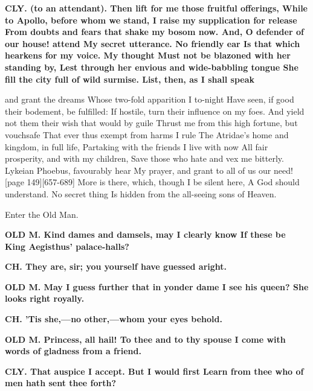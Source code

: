 \documentclass[11pt,letter]{book}
\begin{document}
\par \textbf{CLY. (to an attendant). Then lift for me those fruitful offerings, While to Apollo, before whom we stand, I raise my supplication for release From doubts and fears that shake my bosom now. And, O defender of our house! attend My secret utterance. No friendly ear Is that which hearkens for my voice. My thought Must not be blazoned with her standing by, Lest through her envious and wide-babbling tongue She fill the city full of wild surmise. List, then, as I shall speak}
\par   and grant the dreams Whose two-fold apparition I to-night Have seen, if good their bodement, be fulfilled:  If hostile, turn their influence on my foes. And yield not them their wish that would by guile Thrust me from this high fortune, but vouchsafe That ever thus exempt from harms I rule The Atridae’s home and kingdom, in full life, Partaking with the friends I live with now All fair prosperity, and with my children, Save those who hate and vex me bitterly. Lykeian Phoebus, favourably hear My prayer, and grant to all of us our need! [page 149][657-689] More is there, which, though I be silent here, A God should understand. No secret thing Is hidden from the all-seeing sons of Heaven.

\par  Enter the Old Man.

\par \textbf{OLD M. Kind dames and damsels, may I clearly know If these be King Aegisthus’ palace-halls?}
\par 

\par \textbf{CH. They are, sir; you yourself have guessed aright.}
\par 

\par \textbf{OLD M. May I guess further that in yonder dame I see his queen? She looks right royally.}
\par 

\par \textbf{CH. ’Tis she,—no other,—whom your eyes behold.}
\par 

\par \textbf{OLD M. Princess, all hail! To thee and to thy spouse I come with words of gladness from a friend.}
\par 

\par \textbf{CLY. That auspice I accept. But I would first Learn from thee who of men hath sent thee forth?}
\par 
\end{document}
